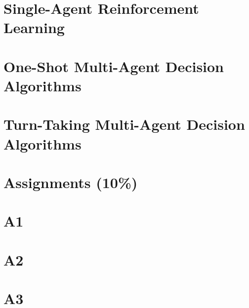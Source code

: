 \documentclass[twoside]{article}
\begin{document}
\section{Single-Agent Reinforcement Learning}

\section{One-Shot Multi-Agent Decision Algorithms}

\section{Turn-Taking Multi-Agent Decision Algorithms}

\section*{Assignments (10\%)}

\section{A1}

\section{A2}

\section{A3}
\end{document}
